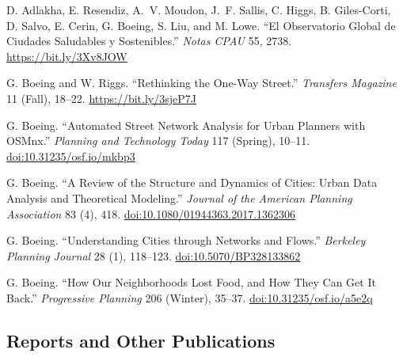 \documentclass[11pt,letterpaper]{report} %
\begin{document}
\begin{tablist}

\item[2024] \tab{}D. Adlakha, E. Resendiz, A.~V. Moudon, J.~F. Sallis, C. Higgs, B. Giles-Corti, D. Salvo, E. Cerin, G. Boeing, S. Liu, and M. Lowe. \enquote{El Observatorio Global de Ciudades Saludables y Sostenibles.} \textit{Notas CPAU} 55, 2738. \href{https://bit.ly/3Xv8JOW}{https://bit.ly/3Xv8JOW}

\item[2023] \tab{}G. Boeing and W. Riggs. \enquote{Rethinking the One-Way Street.} \textit{Transfers Magazine} 11 (Fall), 18--22. \href{https://bit.ly/3sjeP7J}{https://bit.ly/3sjeP7J}

\item[2018] \tab{}G. Boeing. \enquote{Automated Street Network Analysis for Urban Planners with OSMnx.} \textit{Planning and Technology Today} 117 (Spring), 10--11. \href{https://doi.org/10.31235/osf.io/mkbp3}{doi:10.31235/osf.io/mkbp3}

\item[2017] \tab{}G. Boeing. \enquote{A Review of the Structure and Dynamics of Cities: Urban Data Analysis and Theoretical Modeling.} \textit{Journal of the American Planning Association} 83 (4), 418. \href{https://doi.org/10.1080/01944363.2017.1362306}{doi:10.1080/01944363.2017.1362306}

\item[2017] \tab{}G. Boeing. \enquote{Understanding Cities through Networks and Flows.} \textit{Berkeley Planning Journal} 28 (1), 118--123. \href{https://doi.org/10.5070/BP328133862}{doi:10.5070/BP328133862}

\item[2016] \tab{}G. Boeing. \enquote{How Our Neighborhoods Lost Food, and How They Can Get It Back.} \textit{Progressive Planning} 206 (Winter), 35--37. \href{https://doi.org/10.31235/osf.io/a5e2q}{doi:10.31235/osf.io/a5e2q}

\end{tablist}

\subsection*{Reports and Other Publications}
\end{document}
